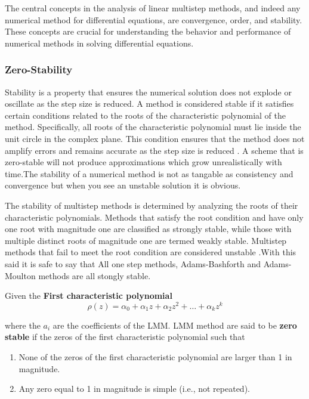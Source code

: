  The central concepts in the analysis of linear multistep methods, and indeed any numerical method for differential equations, are convergence, order, and stability. These concepts are crucial for understanding the behavior and performance of numerical methods in solving differential equations.

 \subsubsection*{Zero-Stability}
 Stability is a property that ensures the numerical solution does not explode or oscillate as the step size is reduced. A method is considered stable if it satisfies certain conditions related to the roots of the characteristic polynomial of the method. Specifically, all roots of the characteristic polynomial must lie inside the unit circle in the complex plane. This condition ensures that the method does not amplify errors and remains accurate as the step size is reduced \cite{wiki:analysis} \cite{Alexanderian2022}. A scheme that is zero-stable will not produce approximations which grow unrealistically with time.The stability of a numerical method is not as tangable as consistency and convergence but when you see an unstable solution it is obvious.

 The stability of multistep methods is determined by analyzing the roots of their characteristic polynomials. Methods that satisfy the root condition and have only one root with magnitude one are classified as strongly stable, while those with multiple distinct roots of magnitude one are termed weakly stable. Multistep methods that fail to meet the root condition are considered unstable \cite{butler_numerical_2022}.With this said it is safe to say that All one step methods, Adams-Bashforth and Adams-Moulton methods are all stongly stable.

 Given the \textbf{First characteristic polynomial} 
 \begin{equation}
  \rho(z) = \alpha_0 + \alpha_1 z + \alpha_2 z^2 + \dots + \alpha_k z^k
 \end{equation}

 where the $a_i$ are the coefficients of the LMM.
 LMM method are said to be \textbf{zero stable} if the zeros of the first characteristic polynomial such that

 \begin{enumerate}
  \item None of the zeros of the first characteristic polynomial are larger than 1 in magnitude.
  \item Any zero equal to 1 in magnitude is simple (i.e., not repeated).
\end{enumerate}

